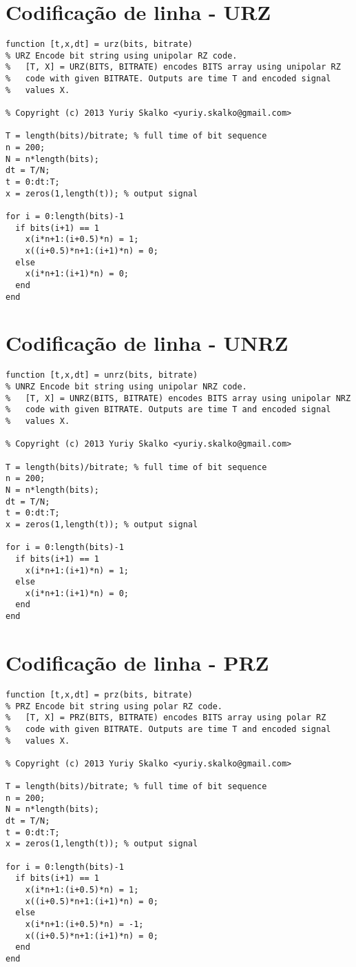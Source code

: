 \section{Codificação de linha - URZ}
\begin{lstlisting}
function [t,x,dt] = urz(bits, bitrate)
% URZ Encode bit string using unipolar RZ code.
%   [T, X] = URZ(BITS, BITRATE) encodes BITS array using unipolar RZ
%   code with given BITRATE. Outputs are time T and encoded signal
%   values X.

% Copyright (c) 2013 Yuriy Skalko <yuriy.skalko@gmail.com>

T = length(bits)/bitrate; % full time of bit sequence
n = 200;
N = n*length(bits);
dt = T/N;
t = 0:dt:T;
x = zeros(1,length(t)); % output signal

for i = 0:length(bits)-1
  if bits(i+1) == 1
    x(i*n+1:(i+0.5)*n) = 1;
    x((i+0.5)*n+1:(i+1)*n) = 0;
  else
    x(i*n+1:(i+1)*n) = 0;
  end
end
\end{lstlisting}

\section{Codificação de linha - UNRZ}
\begin{lstlisting}
function [t,x,dt] = unrz(bits, bitrate)
% UNRZ Encode bit string using unipolar NRZ code.
%   [T, X] = UNRZ(BITS, BITRATE) encodes BITS array using unipolar NRZ
%   code with given BITRATE. Outputs are time T and encoded signal
%   values X.

% Copyright (c) 2013 Yuriy Skalko <yuriy.skalko@gmail.com>

T = length(bits)/bitrate; % full time of bit sequence
n = 200;
N = n*length(bits);
dt = T/N;
t = 0:dt:T;
x = zeros(1,length(t)); % output signal

for i = 0:length(bits)-1
  if bits(i+1) == 1
    x(i*n+1:(i+1)*n) = 1;
  else
    x(i*n+1:(i+1)*n) = 0;
  end
end
\end{lstlisting}

\section{Codificação de linha - PRZ}
\begin{lstlisting}
function [t,x,dt] = prz(bits, bitrate)
% PRZ Encode bit string using polar RZ code.
%   [T, X] = PRZ(BITS, BITRATE) encodes BITS array using polar RZ
%   code with given BITRATE. Outputs are time T and encoded signal
%   values X.

% Copyright (c) 2013 Yuriy Skalko <yuriy.skalko@gmail.com>

T = length(bits)/bitrate; % full time of bit sequence
n = 200;
N = n*length(bits);
dt = T/N;
t = 0:dt:T;
x = zeros(1,length(t)); % output signal

for i = 0:length(bits)-1
  if bits(i+1) == 1
    x(i*n+1:(i+0.5)*n) = 1;
    x((i+0.5)*n+1:(i+1)*n) = 0;
  else
    x(i*n+1:(i+0.5)*n) = -1;
    x((i+0.5)*n+1:(i+1)*n) = 0;
  end
end
\end{lstlisting}


